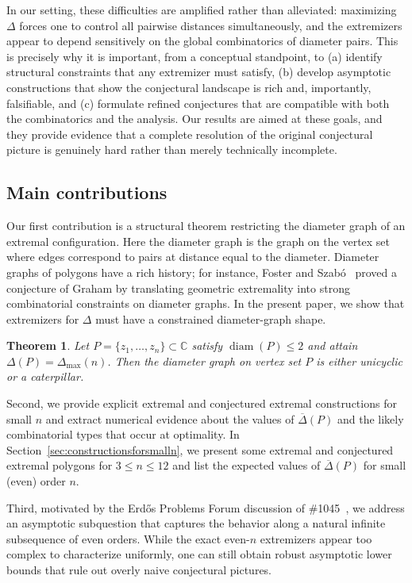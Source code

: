 \documentclass{article}
\DeclareMathOperator{\diam}{diam}
\newtheorem{thr}{Theorem}
\theoremstyle{definition}
\let\le\leqslant
\newcommand*{\oD}{\overline \Delta}
\begin{document}
In our setting, these difficulties are amplified rather than alleviated: maximizing $\Delta$ forces one to control all pairwise distances simultaneously,
and the extremizers appear to depend sensitively on the global combinatorics of diameter pairs.
This is precisely why it is important, from a conceptual standpoint, to (a) identify structural constraints that any extremizer must satisfy,
(b) develop asymptotic constructions that show the conjectural landscape is rich and, importantly, falsifiable,
and (c) formulate refined conjectures that are compatible with both the combinatorics and the analysis.
Our results are aimed at these goals, and they provide evidence that a complete resolution of the original conjectural picture
is genuinely hard rather than merely technically incomplete.

\subsection{Main contributions}

Our first contribution is a structural theorem restricting the diameter graph of an extremal configuration.
Here the diameter graph is the graph on the vertex set where edges correspond to pairs at distance equal to the diameter.
Diameter graphs of polygons have a rich history; for instance, Foster and Szab\'o~\cite{Foster2007DiameterGO} proved a conjecture of Graham
by translating geometric extremality into strong combinatorial constraints on diameter graphs.
In the present paper, we show that extremizers for $\Delta$ must have a constrained diameter-graph shape.

\begin{thr}\label{thr:structure_diametergraph}
Let $P=\{z_1,\dots,z_n\}\subset\mathbb C$ satisfy $\diam(P)\le 2$ and attain $\Delta(P)=\Delta_{\max}(n)$.
Then the diameter graph on vertex set $P$ is either unicyclic or a caterpillar.
\end{thr}



Second, we provide explicit extremal and conjectured extremal constructions for small $n$ and extract numerical evidence
about the values of $\oD(P)$ and the likely combinatorial types that occur at optimality. In Section~\ref{sec:constructionsforsmalln}, we present some extremal and conjectured extremal polygons for $3 \le n \le 12$ and list the expected values of $\oD(P)$ for small (even) order $n$. 

Third, motivated by the Erd\H{o}s Problems Forum discussion of \#1045~\cite{BloomErdosProblem1045}, we address an asymptotic subquestion
that captures the behavior along a natural infinite subsequence of even orders. While the exact even-$n$ extremizers
appear too complex to characterize uniformly, one can still obtain robust asymptotic lower bounds that rule out overly naive conjectural pictures.
\end{document}

